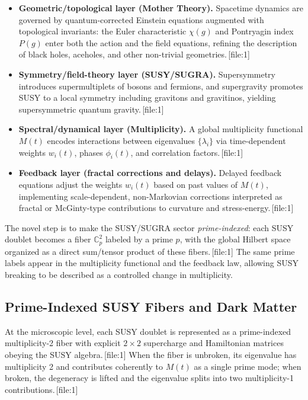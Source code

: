 \documentclass[11pt]{article}
\begin{document}
\begin{itemize}
  \item \textbf{Geometric/topological layer (Mother Theory).} Spacetime dynamics are governed by quantum-corrected Einstein equations augmented with topological invariants: the Euler characteristic \(\chi(g)\) and Pontryagin index \(P(g)\) enter both the action and the field equations, refining the description of black holes, aceholes, and other non-trivial geometries.\,[file:1]
  \item \textbf{Symmetry/field-theory layer (SUSY/SUGRA).} Supersymmetry introduces supermultiplets of bosons and fermions, and supergravity promotes SUSY to a local symmetry including gravitons and gravitinos, yielding supersymmetric quantum gravity.\,[file:1]
  \item \textbf{Spectral/dynamical layer (Multiplicity).} A global multiplicity functional \(M(t)\) encodes interactions between eigenvalues \(\{\lambda_i\}\) via time-dependent weights \(w_i(t)\), phases \(\phi_i(t)\), and correlation factors.\,[file:1]
  \item \textbf{Feedback layer (fractal corrections and delays).} Delayed feedback equations adjust the weights \(w_i(t)\) based on past values of \(M(t)\), implementing scale-dependent, non-Markovian corrections interpreted as fractal or McGinty-type contributions to curvature and stress-energy.\,[file:1]
\end{itemize}

The novel step is to make the SUSY/SUGRA sector \emph{prime-indexed}: each SUSY doublet becomes a fiber \(\mathbb{C}_p^2\) labeled by a prime \(p\), with the global Hilbert space organized as a direct sum/tensor product of these fibers.\,[file:1] The same prime labels appear in the multiplicity functional and the feedback law, allowing SUSY breaking to be described as a controlled change in multiplicity.

\subsection{Prime-Indexed SUSY Fibers and Dark Matter}

At the microscopic level, each SUSY doublet is represented as a prime-indexed multiplicity-2 fiber with explicit \(2\times 2\) supercharge and Hamiltonian matrices obeying the SUSY algebra.\,[file:1] When the fiber is unbroken, its eigenvalue has multiplicity 2 and contributes coherently to \(M(t)\) as a single prime mode; when broken, the degeneracy is lifted and the eigenvalue splits into two multiplicity-1 contributions.\,[file:1]
\end{document}
